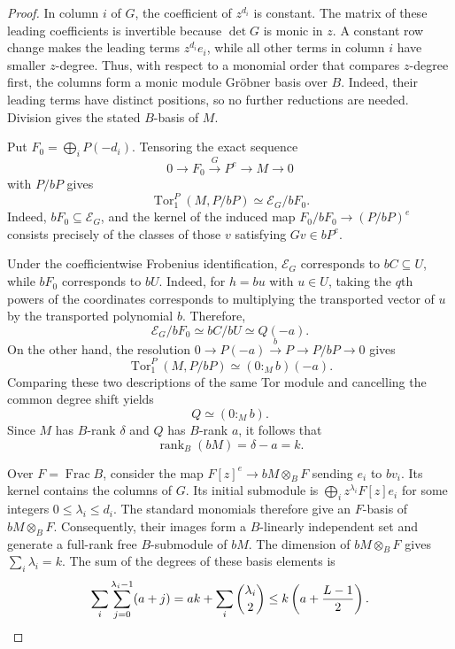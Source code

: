 \documentclass[12pt]{amsart}
\numberwithin{equation}{section}
\theoremstyle{definition}
\theoremstyle{remark}
\numberwithin{equation}{section}
\DeclareMathOperator{\Frac}{Frac}
\begin{document}
\begin{proof}
In column $i$ of $G$, the coefficient of $z^{d_i}$ is constant. The matrix of these leading coefficients is invertible because $\det G$ is monic in $z$. A constant row change makes the leading terms $z^{d_i}e_i$, while all other terms in column $i$ have smaller $z$-degree. Thus, with respect to a monomial order
that compares $z$-degree first, the columns form a monic module Gr\"obner basis over $B$. Indeed, their leading terms have distinct positions, so no further reductions are needed. Division gives the stated $B$-basis of $M$.

Put $F_0=\bigoplus_iP(-d_i)$. Tensoring the exact sequence
\[
 0\longrightarrow F_0\xrightarrow{G}P^e
 \longrightarrow M\longrightarrow0
\]
with $P/bP$ gives
\[
 \operatorname{Tor}_1^P(M,P/bP)\simeq\mathcal E_G/bF_0.
\]
Indeed, $bF_0\subseteq\mathcal E_G$, and the kernel of the induced map $F_0/bF_0\to(P/bP)^e$ consists precisely of the classes of those $v$ satisfying $Gv\in bP^e$.

Under the coefficientwise Frobenius identification, $\mathcal E_G$ corresponds to $bC\subseteq U$, while $bF_0$ corresponds to $bU$. Indeed, for $h=bu$ with $u\in U$, taking the $q$th powers of the coordinates corresponds to multiplying the transported vector of $u$ by the transported polynomial $b$. Therefore,
\[
 \mathcal E_G/bF_0\simeq bC/bU\simeq Q(-a).
\]
On the other hand, the resolution
$0\to P(-a)\xrightarrow{b}P\to P/bP\to0$ gives
\[
 \operatorname{Tor}_1^P(M,P/bP)\simeq(0:_M b)(-a).
\]
Comparing these two descriptions of the same Tor module and cancelling the common degree shift yields
\[
 Q\simeq(0:_M b).
\]
Since $M$ has $B$-rank $\delta$ and $Q$ has $B$-rank $a$, it follows
that
\[
 \operatorname{rank}_B(bM)=\delta-a=k.
\]

Over $F=\Frac B$, consider the map $F[z]^e\to bM\otimes_BF$ sending $e_i$ to $bv_i$. Its kernel contains the columns of $G$. Its initial submodule is
$\bigoplus_i z^{\lambda_i}F[z]e_i$ for some integers $0\le\lambda_i\le d_i$. The standard monomials therefore give an $F$-basis of $bM\otimes_BF$.
Consequently, their images form a $B$-linearly independent set and generate a full-rank free $B$-submodule of $bM$. The dimension of $bM\otimes_BF$ gives
$\sum_i\lambda_i=k$. The sum of the degrees of these basis elements is
\[
 \sum_i\sum_{j=0}^{\lambda_i-1}(a+j)=ak+\sum_i\binom{\lambda_i}{2}\le k\left(a+\frac{L-1}{2}\right).\qedhere
\]
\end{proof}
\end{document}
